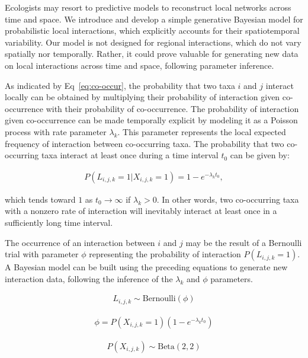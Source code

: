 \begin{box2.1}

Ecologists may resort to predictive models to reconstruct local networks
across time and space. We introduce and develop a simple generative Bayesian
model for probabilistic local interactions, which explicitly accounts for
their spatiotemporal variability. Our model is not designed for regional
interactions, which do not vary spatially nor temporally. Rather, it could
prove valuable for generating new data on local interactions across time and
space, following parameter inference. 

As indicated by Eq~\ref{eq:co-occur}, the probability that two taxa $i$ and $j$
interact locally can be obtained by multiplying their probability of interaction
given co-occurrence with their probability of co-occurrence. The probability of
interaction given co-occurrence can be made temporally explicit by modeling it
as a Poisson process with rate parameter $\lambda_k$. This parameter represents
the local expected frequency of interaction between co-occurring taxa. The
probability that two co-occurring taxa interact at least once during a time
interval $t_0$ can be given by:

\begin{eqnarray}
  \label{eq:modelrate}
  P(L_{i, j, k} = 1| X_{i,j,k} = 1) = 1-e^{-\lambda_k t_0},
\end{eqnarray}

which tends toward $1$ as $t_0 \to \infty$ if $\lambda_k > 0$. In other words,
two co-occurring taxa with a nonzero rate of interaction will inevitably
interact at least once in a sufficiently long time interval. 

The occurrence of an interaction between $i$ and $j$ may be the result of a
Bernoulli trial with parameter $\phi$ representing the probability of
interaction $P(L_{i, j, k} = 1)$. A Bayesian model can be built using the
preceding equations to generate new interaction data, following the inference of
the $\lambda_k$ and $\phi$ parameters.

\begin{eqnarray}
  \label{eq:model}
  L_{i, j, k} \sim \text{Bernoulli}(\phi)
\end{eqnarray}

\begin{eqnarray}
  \label{eq:modeleq}
  \phi = P(X_{i,j,k} = 1)(1-e^{-\lambda_k t_0})
\end{eqnarray}

\begin{eqnarray}
  \label{eq:modelgamma}
  P(X_{i,j,k}) \sim \text{Beta}(2,2)
\end{eqnarray}


\end{box2.1}
